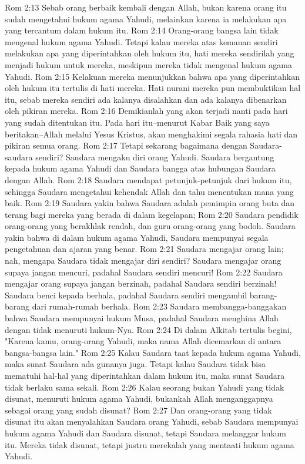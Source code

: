 Rom 2:13  Sebab orang berbaik kembali dengan Allah, bukan karena orang itu sudah mengetahui hukum agama Yahudi, melainkan karena ia melakukan apa yang tercantum dalam hukum itu.
Rom 2:14  Orang-orang bangsa lain tidak mengenal hukum agama Yahudi. Tetapi kalau mereka atas kemauan sendiri melakukan apa yang diperintahkan oleh hukum itu, hati mereka sendirilah yang menjadi hukum untuk mereka, meskipun mereka tidak mengenal hukum agama Yahudi.
Rom 2:15  Kelakuan mereka menunjukkan bahwa apa yang diperintahkan oleh hukum itu tertulis di hati mereka. Hati nurani mereka pun membuktikan hal itu, sebab mereka sendiri ada kalanya disalahkan dan ada kalanya dibenarkan oleh pikiran mereka.
Rom 2:16  Demikianlah yang akan terjadi nanti pada hari yang sudah ditentukan itu. Pada hari itu--menurut Kabar Baik yang saya beritakan--Allah melalui Yesus Kristus, akan menghakimi segala rahasia hati dan pikiran semua orang.
Rom 2:17  Tetapi sekarang bagaimana dengan Saudara-saudara sendiri? Saudara mengaku diri orang Yahudi. Saudara bergantung kepada hukum agama Yahudi dan Saudara bangga atas hubungan Saudara dengan Allah.
Rom 2:18  Saudara mendapat petunjuk-petunjuk dari hukum itu, sehingga Saudara mengetahui kehendak Allah dan tahu menentukan mana yang baik.
Rom 2:19  Saudara yakin bahwa Saudara adalah pemimpin orang buta dan terang bagi mereka yang berada di dalam kegelapan;
Rom 2:20  Saudara pendidik orang-orang yang berakhlak rendah, dan guru orang-orang yang bodoh. Saudara yakin bahwa di dalam hukum agama Yahudi, Saudara mempunyai segala pengetahuan dan ajaran yang benar.
Rom 2:21  Saudara mengajar orang lain; nah, mengapa Saudara tidak mengajar diri sendiri? Saudara mengajar orang supaya jangan mencuri, padahal Saudara sendiri mencuri!
Rom 2:22  Saudara mengajar orang supaya jangan berzinah, padahal Saudara sendiri berzinah! Saudara benci kepada berhala, padahal Saudara sendiri mengambil barang-barang dari rumah-rumah berhala.
Rom 2:23  Saudara membangga-banggakan bahwa Saudara mempunyai hukum Musa, padahal Saudara menghina Allah dengan tidak menuruti hukum-Nya.
Rom 2:24  Di dalam Alkitab tertulis begini, "Karena kamu, orang-orang Yahudi, maka nama Allah dicemarkan di antara bangsa-bangsa lain."
Rom 2:25  Kalau Saudara taat kepada hukum agama Yahudi, maka sunat Saudara ada gunanya juga. Tetapi kalau Saudara tidak bisa mematuhi hal-hal yang diperintahkan dalam hukum itu, maka sunat Saudara tidak berlaku sama sekali.
Rom 2:26  Kalau seorang bukan Yahudi yang tidak disunat, menuruti hukum agama Yahudi, bukankah Allah menganggapnya sebagai orang yang sudah disunat?
Rom 2:27  Dan orang-orang yang tidak disunat itu akan menyalahkan Saudara orang Yahudi, sebab Saudara mempunyai hukum agama Yahudi dan Saudara disunat, tetapi Saudara melanggar hukum itu. Mereka tidak disunat, tetapi justru merekalah yang mentaati hukum agama Yahudi.
